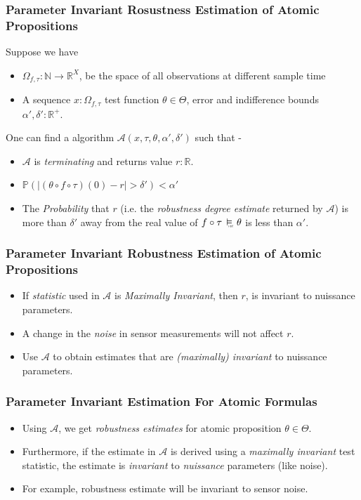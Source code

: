\documentclass{beamer}
\newcommand{\typeReal}{\mathbb{R}}
\newcommand{\typeNat}{\mathbb{N}}
\newcommand{\typeProb}{\mathbb{P}}
\newcommand{\A}{\mathcal{A}}
\newcommand{\discrete}{\raisebox{-0.1ex}{\scalebox{0.25}{\textrm{DSC}}}}
\newcommand{\discreteSatisfy}{\ \stackMath\stackunder[0pt]{\vDash}{\hspace*{0.3em}\discrete}\ }
\begin{document}
\begin{frame}
\frametitle{Parameter Invariant Rosustness Estimation of Atomic Propositions}

    Suppose we have
    \begin{itemize}
        \item $\Omega_{f, \tau}: \typeNat \to \typeReal^{X}$, be the space
        of all observations at different sample time
        \item A sequence $x: \Omega_{f, \tau}$ test function $\theta \in \Theta$,
        error and indifference bounds $\alpha', \delta' :\typeReal^{+}$.
    \end{itemize}
    One can find a algorithm $\A(x, \tau, \theta, \alpha', \delta')$ such that -
    \begin{itemize}
        \item $\A$ is \textit{terminating} and returns value $r:\typeReal$.
        \item $\typeProb({\mid (\theta \circ f \circ \tau)(0) - r \mid > \delta'}) < \alpha'$
        \item The \textit{Probability} that $r$ (i.e. the \textit{robustness degree estimate}
            returned by $\A$) is more than $\delta'$ away from the real value of
            $f \circ \tau \discreteSatisfy \theta$ is less than $\alpha'$.
    \end{itemize}

\end{frame}

\begin{frame}

\frametitle{Parameter Invariant Robustness Estimation of Atomic Propositions}
    \begin{itemize}
        \item If \textit{statistic} used in $\A$ is \textit{Maximally
            Invariant}, then $r$, is invariant to nuissance parameters.
        \item A change in the \textit{noise} in sensor measurements
            will not affect $r$.
        \item Use $\A$ to obtain
             estimates that are \textit{(maximally) invariant}
             to nuissance parameters.
    \end{itemize}
\end{frame}

\begin{frame}

\frametitle{Parameter Invariant Estimation For Atomic Formulas}
    \begin{itemize}
        \item Using $\A$, we get \textit{robustness estimates}
            for atomic proposition $\theta \in \Theta$.
        \item Furthermore, if the estimate in $\A$ is derived
            using a \textit{maximally invariant} test statistic,
            the estimate is \textit{invariant} to \textit{nuissance}
            parameters (like noise).
        \item For example, robustness estimate will be invariant
            to sensor noise.
    \end{itemize}
\end{frame}
\end{document}
